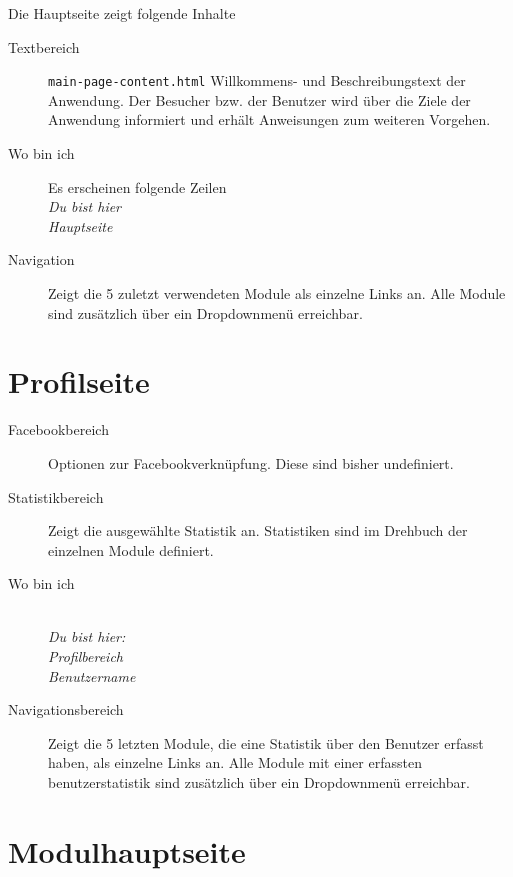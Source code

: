 Die Hauptseite zeigt folgende Inhalte
\begin{description}
  \item[Textbereich] \texttt{main-page-content.html} Willkommens- und Beschreibungstext der Anwendung. Der Besucher bzw. der Benutzer wird über die Ziele der Anwendung informiert und erhält Anweisungen zum weiteren Vorgehen.
  \item[Wo bin ich] Es erscheinen folgende Zeilen \emph{\\Du bist hier \\Hauptseite}
  \item[Navigation] Zeigt die 5 zuletzt verwendeten Module als einzelne Links an. Alle Module sind zusätzlich über ein Dropdownmenü erreichbar.
	
\end{description}




%
%
%
\section{Profilseite}
\label{sec:profile-page}

\begin{description}
  \item[Facebookbereich] Optionen zur Facebookverknüpfung. Diese sind bisher undefiniert.
  \item[Statistikbereich] Zeigt die ausgewählte Statistik an. Statistiken sind im Drehbuch der einzelnen Module definiert.
  \item[Wo bin ich] \emph{\\Du bist hier:\\Profilbereich\\Benutzername}
  \item[Navigationsbereich] Zeigt die 5 letzten Module, die eine Statistik über den Benutzer erfasst haben, als einzelne 	Links an. Alle Module mit einer erfassten benutzerstatistik sind zusätzlich über ein Dropdownmenü 	erreichbar.
\end{description}




%
%
%
\section{Modulhauptseite}
\label{sec:module-main-page}

